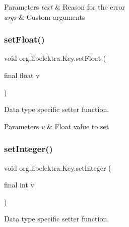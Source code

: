 \begin{DoxyParams}{Parameters}
{\em text} & Reason for the error \\
\hline
{\em args} & Custom arguments \\
\hline
\end{DoxyParams}
\mbox{\label{classorg_1_1libelektra_1_1Key_a1436207a0efa244538c935766b8db470}} 
\subsubsection{\texorpdfstring{set\+Float()}{setFloat()}}
{\footnotesize\ttfamily void org.\+libelektra.\+Key.\+set\+Float (\begin{DoxyParamCaption}\item[{final float}]{v }\end{DoxyParamCaption})\hspace{0.3cm}{\ttfamily [inline]}}



Data type specific setter function. 


\begin{DoxyParams}{Parameters}
{\em v} & Float value to set \\
\hline
\end{DoxyParams}
\mbox{\label{classorg_1_1libelektra_1_1Key_a290d278b4c11ea4bcabf82c0c97e6350}} 
\subsubsection{\texorpdfstring{set\+Integer()}{setInteger()}}
{\footnotesize\ttfamily void org.\+libelektra.\+Key.\+set\+Integer (\begin{DoxyParamCaption}\item[{final int}]{v }\end{DoxyParamCaption})\hspace{0.3cm}{\ttfamily [inline]}}



Data type specific setter function. 


